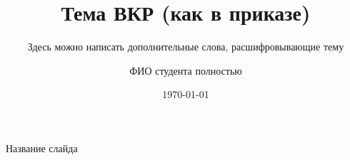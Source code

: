 \documentclass[10pt,pdf,hyperref={unicode}]{beamer}
\title{Тема ВКР (как в приказе)}
\subtitle{Здесь можно написать дополнительные слова, расшифровывающие тему}
\author{ФИО студента полностью}
\date{\today}
\begin{document}
\begin{frame}
	\titlepage
\end{frame} 
	
\begin{frame}{Название слайда}

\end{frame}
\end{document}
